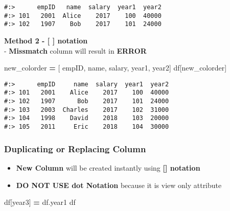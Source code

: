 \documentclass[
]{book}
\newenvironment{Shaded}{\begin{snugshade}}{\end{snugshade}}
\newcommand{\NormalTok}[1]{#1}
\newcommand{\OperatorTok}[1]{\textcolor[rgb]{0.43,0.43,0.43}{\textbf{#1}}}
\newcommand{\StringTok}[1]{\textcolor[rgb]{0.5,0.5,0.5}{#1}}
\providecommand{\tightlist}{%
  \setlength{\itemsep}{0pt}\setlength{\parskip}{0pt}}
\begin{document}
\begin{verbatim}
#:>      empID   name  salary  year1  year2
#:> 101   2001  Alice    2017    100  40000
#:> 102   1907    Bob    2017    101  24000
\end{verbatim}

\textbf{Method 2 - {[} {]} notation}\\
- \textbf{Missmatch} column will result in \textbf{ERROR}

\begin{Shaded}
\begin{Highlighting}[]
\NormalTok{new\_colorder }\OperatorTok{=}\NormalTok{ [ }\StringTok{\textquotesingle{}empID\textquotesingle{}}\NormalTok{, }\StringTok{\textquotesingle{}name\textquotesingle{}}\NormalTok{, }\StringTok{\textquotesingle{}salary\textquotesingle{}}\NormalTok{, }\StringTok{\textquotesingle{}year1\textquotesingle{}}\NormalTok{, }\StringTok{\textquotesingle{}year2\textquotesingle{}}\NormalTok{]}
\NormalTok{df[new\_colorder]}
\end{Highlighting}
\end{Shaded}

\begin{verbatim}
#:>      empID     name  salary  year1  year2
#:> 101   2001    Alice    2017    100  40000
#:> 102   1907      Bob    2017    101  24000
#:> 103   2003  Charles    2017    102  31000
#:> 104   1998    David    2018    103  20000
#:> 105   2011     Eric    2018    104  30000
\end{verbatim}

\hypertarget{duplicating-or-replacing-column}{%
\subsubsection{Duplicating or Replacing Column}\label{duplicating-or-replacing-column}}

\begin{itemize}
\tightlist
\item
  \textbf{New Column} will be created instantly using \textbf{{[}{]} notation}\\
\item
  \textbf{DO NOT USE dot Notation} because it is view only attribute
\end{itemize}

\begin{Shaded}
\begin{Highlighting}[]
\NormalTok{df[}\StringTok{\textquotesingle{}year3\textquotesingle{}}\NormalTok{] }\OperatorTok{=}\NormalTok{ df.year1}
\NormalTok{df}
\end{Highlighting}
\end{Shaded}
\end{document}
